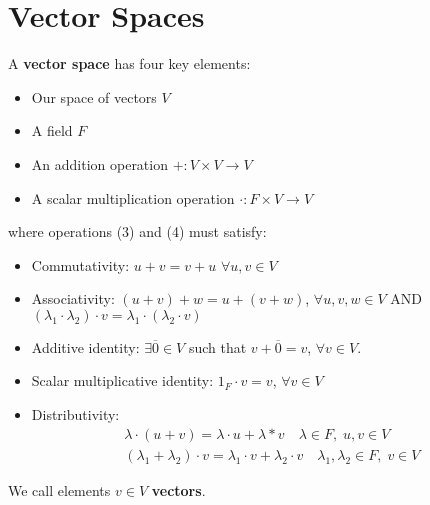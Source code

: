 \documentclass{memoir}
\begin{document}


\chapter{Vector Spaces}

\begin{defn}
A \textbf{vector space} has four key elements:

\begin{itemize}
	\item Our space of vectors $V$
	\item A field $F$
	\item An addition operation \(+:V\times V \to V\)
	\item A scalar multiplication operation \(\cdot:F\times V \to V\)
\end{itemize}

where operations (3) and (4) must satisfy:
\begin{itemize}
	\item Commutativity: $u + v = v + u$ $ \forall u,v \in V$
	\item Associativity: $(u+v)+w = u+(v+w)$, $ \forall u,v,w \in V$ AND $(\lambda_1 \cdot  \lambda_2)\cdot v = \lambda_1 \cdot (\lambda_2\cdot v)$
	\item Additive identity: $\exists \overline{0}\in V$ such that $v+\overline{0} = v$, $\forall v\in V$.
	\item Scalar multiplicative identity: $1_F \cdot v = v$, $\forall v\in V$
	\item Distributivity: 
\begin{align*}
		\lambda \cdot (u+v) = \lambda \cdot u + \lambda * v \quad \lambda \in F, \; u,v \in V\\
	(\lambda_1 + \lambda_2) \cdot v = \lambda_1 \cdot v + \lambda_2 \cdot v \quad \lambda_1, \lambda_2 \in F, \; v \in V
\end{align*}
\end{itemize}
We call elements \(v \in V\) \textbf{vectors}.
\end{defn}
\end{document}

